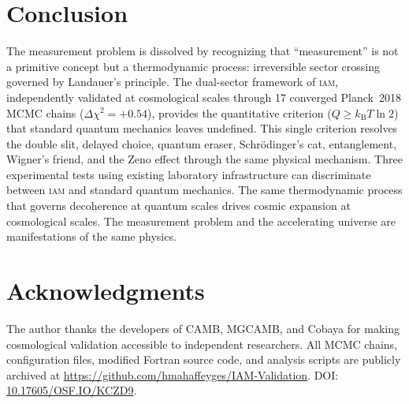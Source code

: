 \documentclass[12pt,letterpaper]{article}
\newcommand{\IAM}{\textsc{iam}}
\newcommand{\kB}{k_{\mathrm{B}}}
\begin{document}
\section{Conclusion}

The measurement problem is dissolved by recognizing that ``measurement''
is not a primitive concept but a thermodynamic process: irreversible
sector crossing governed by Landauer's principle. The dual-sector
framework of \IAM, independently validated at cosmological scales
through 17 converged Planck~2018 MCMC chains ($\Delta\chi^2 = +0.54$),
provides the quantitative criterion ($Q \geq \kB T \ln 2$) that standard
quantum mechanics leaves undefined. This single criterion resolves the
double slit, delayed choice, quantum eraser, Schr\"{o}dinger's cat,
entanglement, Wigner's friend, and the Zeno effect through the same
physical mechanism. Three experimental tests using existing laboratory
infrastructure can discriminate between \IAM{} and standard quantum
mechanics. The same thermodynamic process that governs decoherence at
quantum scales drives cosmic expansion at cosmological scales. The
measurement problem and the accelerating universe are manifestations of
the same physics.

\section*{Acknowledgments}

The author thanks the developers of CAMB, MGCAMB, and Cobaya for making
cosmological validation accessible to independent researchers. All MCMC
chains, configuration files, modified Fortran source code, and analysis
scripts are publicly archived at
\url{https://github.com/hmahaffeyges/IAM-Validation}.
DOI: \href{https://doi.org/10.17605/OSF.IO/KCZD9}{10.17605/OSF.IO/KCZD9}.
\end{document}
